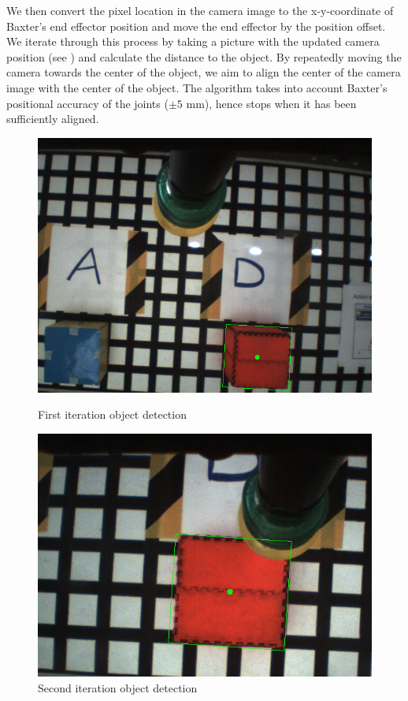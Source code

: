 We then convert the pixel location in the camera image to the x-y-coordinate of Baxter's end effector position and move the end effector by the position offset.
We iterate through this process by taking a picture with the updated camera position (see ) and calculate the distance to the object.
By repeatedly moving the camera towards the center of the object, we aim to align the center of the camera image with the center of the object.
The algorithm takes into account Baxter's positional accuracy of the joints ($\pm 5$ mm), hence stops when it has been sufficiently aligned.
\begin{figure}[h]
\centering
\begin{minipage}{0.5\textwidth}
  \centering
    \includegraphics[scale=0.35]{figures/detectObject1}
    \caption{First iteration object detection}
    \label{fig:detectObject1}
\end{minipage}%
\begin{minipage}{.5\textwidth}
  \centering
    \includegraphics[scale=0.45]{figures/detectObject2}
    \caption{Second iteration object detection}
    \label{fig:detectObject2}
\end{minipage}
\end{figure}

